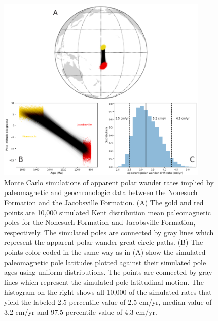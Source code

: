 \begin{figure}
\centering
\includegraphics[width=0.9\textwidth]{figure/Zhang2024a/SI_Jacobsville_Nonesuch_rate.pdf}
\caption[Monte Carlo simulations of apparent polar wander rates implied by paleomagnetic and geochronologic data between the Nonesuch Formation and the Jacobsville Formation]{Monte Carlo simulations of apparent polar wander rates implied by paleomagnetic and geochronologic data between the Nonesuch Formation and the Jacobsville Formation. (A) The gold and red points are 10,000 simulated Kent distribution mean paleomagnetic poles for the Nonesuch Formation and Jacobsville Formation, respectively. The simulated poles are connected by gray lines which represent the apparent polar wander great circle paths. (B) The points color-coded in the same way as in (A) show the simulated paleomagnetic pole latitudes plotted against their simulated pole ages using uniform distributions. The points are connected by gray lines which represent the simulated pole latitudinal motion. The histogram on the right shows all 10,000 of the simulated rates that yield the labeled 2.5 percentile value of 2.5 cm/yr, median value of 3.2 cm/yr and 97.5 percentile value of 4.3 cm/yr.}
\label{fig:Jacobsville_Nonesuch_rate}
\end{figure}

